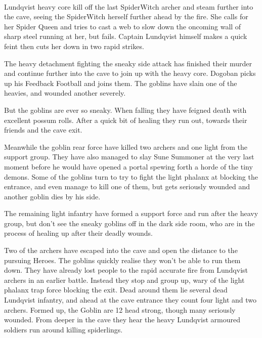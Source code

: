 \

Lundqvist heavy core kill off the last SpiderWitch archer and steam further into the cave, seeing the SpiderWitch herself further ahead by the fire. She calls for her Spider Queen and tries to cast a web to slow down the oncoming wall of sharp steel running at her, but fails. Captain Lundqvist himself makes a quick feint then cuts her down in two rapid strikes.

The heavy detachment fighting the sneaky side attack has finished their murder and continue further into the cave to join up with the heavy core. Dogoban picks up his Feedback Football and joins them. The goblins have slain one of the heavies, and wounded another severely.

But the goblins are ever so sneaky. When falling they have feigned death with excellent possum rolls. After a quick bit of healing they run out, towards their friends and the cave exit.

Meanwhile the goblin rear force have killed two archers and one light from the support group. They have also managed to slay Sune Summoner at the very last moment before he would have opened a portal spewing forth a horde of the tiny demons.
Some of the goblins turn to try to fight the light phalanx at blocking the entrance, and even manage to kill one of them, but gets seriously wounded and another goblin dies by his side.

The remaining light infantry have formed a support force and run after the heavy group, but don't see the sneaky goblins off in the dark side room, who are in the process of healing up after their deadly wounds. 

Two of the archers have escaped into the cave and open the distance to the pursuing Heroes. The goblins quickly realise they won't be able to run them down. They have already lost people to the rapid accurate fire from Lundqvist archers in an earlier battle. Instead they stop and group up, wary of the light phalanx trap force blocking the exit.
Dead around them lie several dead Lundqvist infantry, and ahead at the cave entrance they count four light and two archers. Formed up, the Goblin are 12 head strong, though many seriously wounded. From deeper in the cave they hear the heavy Lundqvist armoured soldiers run around killing spiderlings. 


